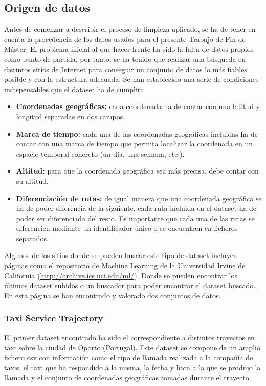 \subsection{Origen de datos}
Antes de comenzar a describir el proceso de limpieza aplicado, se ha de tener en cuenta la procedencia de los datos usados para el presente Trabajo de Fin de Máster. El problema inicial al que hacer frente ha sido la falta de datos propios como punto de partida, por tanto, se ha tenido que realizar una búsqueda en distintos sitios de Internet para conseguir un conjunto de datos lo más fiables posible y con la estructura adecuada. Se han establecido una serie de condiciones indispensables que el dataset ha de cumplir:
\begin{itemize}
\item \textbf{Coordenadas geográficas:} cada coordenada ha de contar con una latitud y longitud separadas en dos campos.
\item \textbf{Marca de tiempo:} cada una de las coordenadas geográficas incluidas ha de contar con una marca de tiempo que permita localizar la coordenada en un espacio temporal concreto (un día, una semana, etc.).
\item \textbf{Altitud:} para que la coordenada geográfica sea más precisa, debe contar con su altitud.
\item \textbf{Diferenciación de rutas:} de igual manera que una coordenada geográfica se ha de poder diferencia de la siguiente, cada ruta incluida en el dataset ha de poder ser diferenciada del resto. Es importante que cada una de las rutas se diferencien mediante un identificador único o se encuentren en ficheros separados.
\end{itemize}

Algunos de los sitios donde se pueden buscar este tipo de dataset incluyen páginas como el repositorio de Machine Learning de la Universidad Irvine de California (\url{http://archive.ics.uci.edu/ml/}). Donde se pueden encontrar los últimos dataset subidos o un buscador para poder encontrar el dataset buscado. En esta página se han encontrado y valorado dos conjuntos de datos.

\subsubsection{Taxi Service Trajectory}
El primer dataset encontrado ha sido el correspondiente a distintos trayectos en taxi sobre la ciudad de Oporto (Portugal). Este dataset se compone de un amplio fichero csv con información como el tipo de llamada realizada a la compañía de taxis, el taxi que ha respondido a la misma, la fecha y hora a la que se produjo la llamada y el conjunto de coordenadas geográficas tomadas durante el trayecto.

